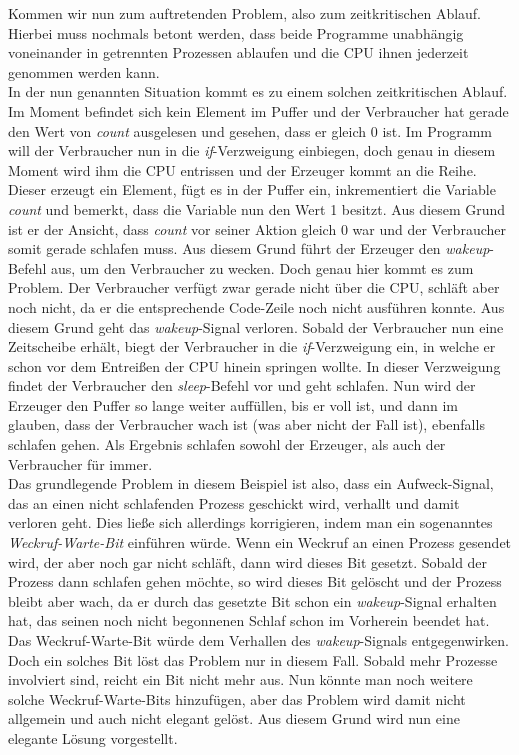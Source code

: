\begin{description}
\begin{description}
								
								
								Kommen wir nun zum auftretenden Problem, also zum zeitkritischen Ablauf. Hierbei muss nochmals betont werden, dass beide Programme unabhängig voneinander in getrennten Prozessen ablaufen und die CPU ihnen jederzeit genommen werden kann.\\
								In der nun genannten Situation kommt es zu einem solchen zeitkritischen Ablauf. Im Moment befindet sich kein Element im Puffer und der Verbraucher hat gerade den Wert von \textit{count} ausgelesen und gesehen, dass er gleich 0 ist. Im Programm will der Verbraucher nun in die \textit{if}-Verzweigung einbiegen, doch genau in diesem Moment wird ihm die CPU entrissen und der Erzeuger kommt an die Reihe. Dieser erzeugt ein Element, fügt es in der Puffer ein, inkrementiert die Variable \textit{count} und bemerkt, dass die Variable nun den Wert 1 besitzt. Aus diesem Grund ist er der Ansicht, dass \textit{count} vor seiner Aktion gleich 0 war und der Verbraucher somit gerade schlafen muss. Aus diesem Grund führt der Erzeuger den \textit{wakeup}-Befehl aus, um den Verbraucher zu wecken. Doch genau hier kommt es zum Problem. Der Verbraucher verfügt zwar gerade nicht über die CPU, schläft aber noch nicht, da er die entsprechende Code-Zeile noch nicht ausführen konnte. Aus diesem Grund geht das \textit{wakeup}-Signal verloren. Sobald der Verbraucher nun eine Zeitscheibe erhält, biegt der Verbraucher in die \textit{if}-Verzweigung ein, in welche er schon vor dem Entreißen der CPU hinein springen wollte. In dieser Verzweigung findet der Verbraucher den \textit{sleep}-Befehl vor und geht schlafen. Nun wird der Erzeuger den Puffer so lange weiter auffüllen, bis er voll ist, und dann im glauben, dass der Verbraucher wach ist (was aber nicht der Fall ist), ebenfalls schlafen gehen. Als Ergebnis schlafen sowohl der Erzeuger, als auch der Verbraucher für immer. \cite{BetriebssystemeNetzmafia}\\
								Das grundlegende Problem in diesem Beispiel ist also, dass ein Aufweck-Signal, das an einen nicht schlafenden Prozess geschickt wird, verhallt und damit verloren geht. Dies ließe sich allerdings korrigieren, indem man ein sogenanntes \textit{Weckruf-Warte-Bit} einführen würde. Wenn ein Weckruf an einen Prozess gesendet wird, der aber noch gar nicht schläft, dann wird dieses Bit gesetzt. Sobald der Prozess dann schlafen gehen möchte, so wird dieses Bit gelöscht und der Prozess bleibt aber wach, da er durch das gesetzte Bit schon ein \textit{wakeup}-Signal erhalten hat, das seinen noch nicht begonnenen Schlaf schon im Vorherein beendet hat. Das Weckruf-Warte-Bit würde dem Verhallen des \textit{wakeup}-Signals entgegenwirken.\\
								Doch ein solches Bit löst das Problem nur in diesem Fall. Sobald mehr Prozesse involviert sind, reicht ein Bit nicht mehr aus. Nun könnte man noch weitere solche Weckruf-Warte-Bits hinzufügen, aber das Problem wird damit nicht allgemein und auch nicht elegant gelöst.
								Aus diesem Grund wird nun eine elegante Lösung vorgestellt.
								

\end{description}
\end{description}

